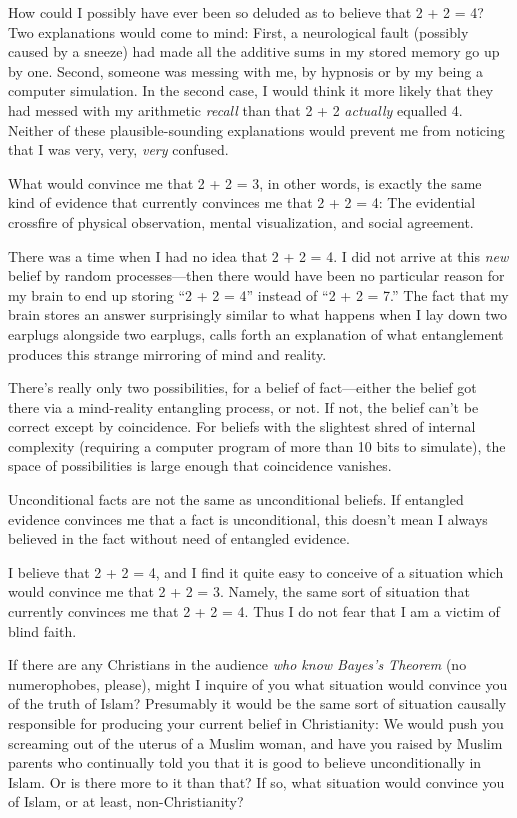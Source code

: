 {
 How could I possibly have ever been so deluded as to believe that
2 + 2 = 4? Two explanations would come to mind: First, a neurological
fault (possibly caused by a sneeze) had made all the additive sums in
my stored memory go up by one. Second, someone was messing with me, by
hypnosis or by my being a computer simulation. In the second case, I
would think it more likely that they had messed with my arithmetic
\textit{recall} than that 2 + 2 \textit{actually} equalled 4. Neither
of these plausible-sounding explanations would prevent me from noticing
that I was very, very, \textit{very} confused.}

{
 What would convince me that 2 + 2 = 3, in other words, is exactly
the same kind of evidence that currently convinces me that 2 + 2 = 4:
The evidential crossfire of physical observation, mental visualization,
and social agreement.}

{
 There was a time when I had no idea that 2 + 2 = 4. I did not
arrive at this \textit{new} belief by random processes---then there
would have been no particular reason for my brain to end up storing
``2 + 2 = 4'' instead of
``2 + 2 = 7.'' The fact that my
brain stores an answer surprisingly similar to what happens when I lay
down two earplugs alongside two earplugs, calls forth an explanation of
what entanglement produces this strange mirroring of mind and reality.}

{
 There's really only two possibilities, for a
belief of fact---either the belief got there via a mind-reality
entangling process, or not. If not, the belief can't be
correct except by coincidence. For beliefs with the slightest shred of
internal complexity (requiring a computer program of more than 10 bits
to simulate), the space of possibilities is large enough that
coincidence vanishes.}

{
 Unconditional facts are not the same as unconditional beliefs. If
entangled evidence convinces me that a fact is unconditional, this
doesn't mean I always believed in the fact without need
of entangled evidence.}

{
 I believe that 2 + 2 = 4, and I find it quite easy to conceive of
a situation which would convince me that 2 + 2 = 3. Namely, the same
sort of situation that currently convinces me that 2 + 2 = 4. Thus I do
not fear that I am a victim of blind faith.}

{
 If there are any Christians in the audience \textit{who know
Bayes's Theorem} (no numerophobes, please), might I
inquire of you what situation would convince you of the truth of Islam?
Presumably it would be the same sort of situation causally responsible
for producing your current belief in Christianity: We would push you
screaming out of the uterus of a Muslim woman, and have you raised by
Muslim parents who continually told you that it is good to believe
unconditionally in Islam. Or is there more to it than that? If so, what
situation would convince you of Islam, or at least, non-Christianity?}

